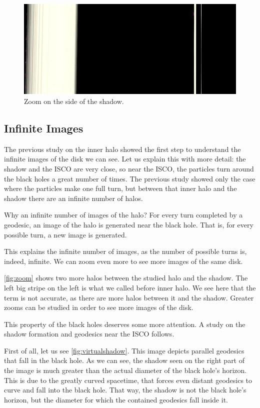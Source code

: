 \begin{figure}[bth]
	\myfloatalign
	\includegraphics[width=.6\linewidth]{gfx/zoom}
	\caption[Zoom on the side of the shadow]{Zoom on the side of the shadow.}
\label{fig:zoom}
\end{figure}

\subsection{Infinite Images}

The previous study on the inner halo showed the first step to understand the infinite images of the disk we can see. Let us explain this with more detail: the shadow and the \ac{ISCO} are very close, so near the \ac{ISCO}, the particles turn around the black holes a great number of times. The previous study showed only the case where the particles make one full turn, but between that inner halo and the shadow there are an infinite number of halos.

Why an infinite number of images of the halo? For every turn completed by a geodesic, an image of the halo is generated near the black hole. That is, for every possible turn, a new image is generated.

This explains the infinite number of images, as the number of possible turns is, indeed, infinite. We can zoom even more to see more images of the same disk. 

\autoref{fig:zoom} shows two more halos between the studied halo and the shadow. The left big stripe on the left is what we called before inner halo. We see here that the term is not accurate, as there are more halos between it and the shadow. Greater zooms can be studied in order to see more images of the disk.

This property of the black holes deserves some more attention. A study on the shadow formation and geodesics near the \ac{ISCO} follows.

First of all, let us see \autoref{fig:virtualshadow}. This image depicts parallel geodesics that fall in the black hole. As we can see, the shadow seen on the right part of the image is much greater than the actual diameter of the black hole's horizon. This is due to the greatly curved spacetime, that forces even distant geodesics to curve and fall into the black hole. That way, the shadow is not the black hole's horizon, but the diameter for which the contained geodesics fall inside it.

